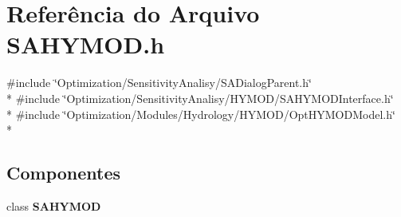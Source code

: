 \section{Referência do Arquivo S\+A\+H\+Y\+M\+O\+D.\+h}
\label{_s_a_h_y_m_o_d_8h}
{\ttfamily \#include \char`\"{}Optimization/\+Sensitivity\+Analisy/\+S\+A\+Dialog\+Parent.\+h\char`\"{}}\\*
{\ttfamily \#include \char`\"{}Optimization/\+Sensitivity\+Analisy/\+H\+Y\+M\+O\+D/\+S\+A\+H\+Y\+M\+O\+D\+Interface.\+h\char`\"{}}\\*
{\ttfamily \#include \char`\"{}Optimization/\+Modules/\+Hydrology/\+H\+Y\+M\+O\+D/\+Opt\+H\+Y\+M\+O\+D\+Model.\+h\char`\"{}}\\*
\subsection*{Componentes}
\begin{DoxyCompactItemize}
\item 
class {\bf S\+A\+H\+Y\+M\+OD}
\end{DoxyCompactItemize}
